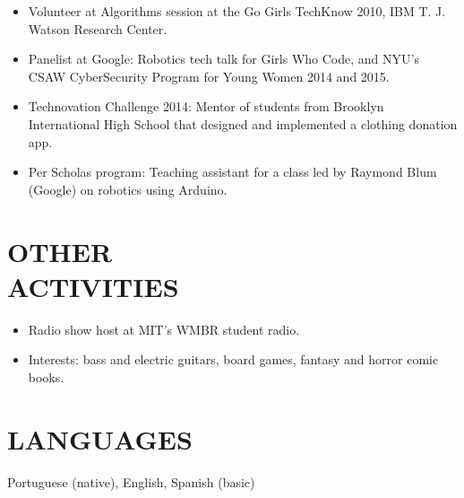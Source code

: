 \documentclass[line,margin]{res}
\begin{document}
\begin{resume}
\begin{itemize}
	      \item Volunteer at Algorithms session at the Go Girls TechKnow 2010, IBM T. J. Watson Research Center.
	      \item Panelist at Google: Robotics tech talk for Girls Who Code, and NYU's 
	      CSAW CyberSecurity Program for Young Women 2014 and 2015.
	      \item Technovation Challenge 2014: Mentor of students from Brooklyn International High School that designed and implemented a clothing donation app.
	      \item Per Scholas program: Teaching assistant for a class led by Raymond Blum (Google) on robotics using Arduino.
               \end{itemize}

\section{OTHER \\ ACTIVITIES}            \begin{itemize}  \itemsep -2pt
            \item Radio show host at MIT's WMBR student radio.
            \item Interests: bass and electric guitars, board games, fantasy and horror comic books.
            \end{itemize}

\section{LANGUAGES}
Portuguese (native), English, Spanish (basic)

\end{resume}
\end{document}
